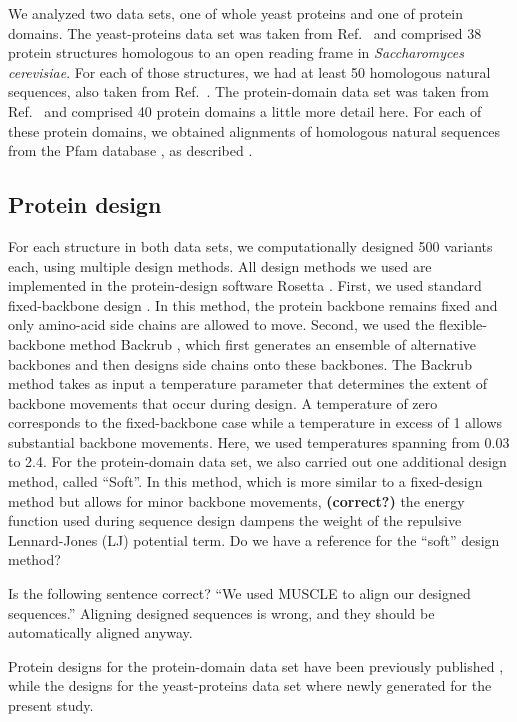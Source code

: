 \documentclass[12pt]{article}
\begin{document}
We analyzed two data sets, one of whole yeast proteins and one of protein domains. The yeast-proteins data set was taken from Ref.\ \cite{Ramsey2011} and comprised 38 protein structures homologous to an open reading frame in \emph{Saccharomyces cerevisiae}. For each of those structures, we had at least 50 homologous natural sequences, also taken from Ref.\ \cite{Ramsey2011}. The protein-domain data set was taken from Ref.\ \cite{OllikainenKortemme} and comprised 40 protein domains {\color{red} a little more detail here}. For each of these protein domains, we obtained alignments of homologous natural sequences from the Pfam database \cite{Pfam}, as described \cite{OllikainenKortemme}.


\subsection{Protein design}

For each structure in both data sets, we computationally designed 500 variants each, using multiple design methods. All design methods we used are implemented in the protein-design software Rosetta \cite{generic-rosetta-reference}. First, we used standard fixed-backbone design \cite{fixed-design}. In this method, the protein backbone remains fixed and only amino-acid side chains are allowed to move. Second, we used the flexible-backbone method Backrub \cite{Smith2008}, which first generates an ensemble of alternative backbones and then designs side chains onto these backbones. The Backrub method takes as input a temperature parameter that determines the extent of backbone movements that occur during design. A temperature of zero corresponds to the fixed-backbone case while a temperature in excess of 1 allows substantial backbone movements. Here, we used temperatures spanning from 0.03 to 2.4. For the protein-domain data set, we also carried out one additional design method, called ``Soft''. In this method, {\color{red}which is more similar to a fixed-design method but allows for minor backbone movements, \textbf{(correct?)}} the energy function used during sequence design dampens the weight of the repulsive Lennard-Jones (LJ) potential term. {\color{red}Do we have a reference for the ``soft'' design method?}

{\color{red}Is the following sentence correct? ``We used MUSCLE \cite{Edgar2004} to align our designed sequences.'' Aligning designed sequences is wrong, and they should be automatically aligned anyway.}

Protein designs for the protein-domain data set have been previously published \cite{OllikainenKortemme}, while the designs for the yeast-proteins data set where newly generated for the present study.
\end{document}
